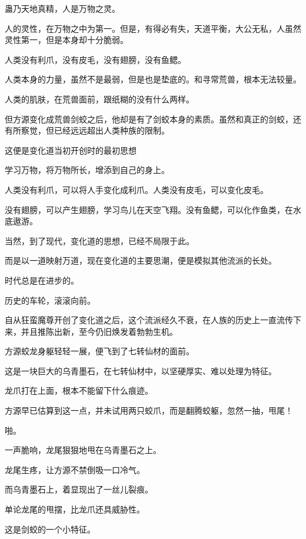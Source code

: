 
\begin{this_body}



蛊乃天地真精，人是万物之灵。

人的灵性，在万物之中为第一。但是，有得必有失，天道平衡，大公无私，人虽然灵性第一，但是本身却十分脆弱。

人类没有利爪，没有皮毛，没有翅膀，没有鱼鳃。

人类本身的力量，虽然不是最弱，但是也是垫底的。和寻常荒兽，根本无法较量。

人类的肌肤，在荒兽面前，跟纸糊的没有什么两样。

但方源变化成荒兽剑蛟之后，他却是有了剑蛟本身的素质。虽然和真正的剑蛟，还有所察觉，但已经远远超出人类种族的限制。

这便是变化道当初开创时的最初思想

学习万物，将万物所长，增添到自己的身上。

人类没有利爪，可以将人手变化成利爪。人类没有皮毛，可以变化皮毛。

没有翅膀，可以产生翅膀，学习鸟儿在天空飞翔。没有鱼鳃，可以化作鱼类，在水底遨游。

当然，到了现代，变化道的思想，已经不局限于此。

而是以一道映射万道，现在变化道的主要思潮，便是模拟其他流派的长处。

时代总是在进步的。

历史的车轮，滚滚向前。

自从狂蛮魔尊开创了变化道之后，这个流派经久不衰，在人族的历史上一直流传下来，并且推陈出新，至今仍旧焕发着勃勃生机。

方源蛟龙身躯轻轻一展，便飞到了七转仙材的面前。

这是一块巨大的乌青墨石，在七转仙材中，以坚硬厚实、难以处理为特征。

龙爪打在上面，根本不能留下什么痕迹。

方源早已估算到这一点，并未试用两只蛟爪，而是翻腾蛟躯，忽然一抽，甩尾！

啪。

一声脆响，龙尾狠狠地甩在乌青墨石之上。

龙尾生疼，让方源不禁倒吸一口冷气。

而乌青墨石上，着显现出了一丝儿裂痕。

单论龙尾的甩摆，比龙爪还具威胁性。

这是剑蛟的一个小特征。


\end{this_body}
